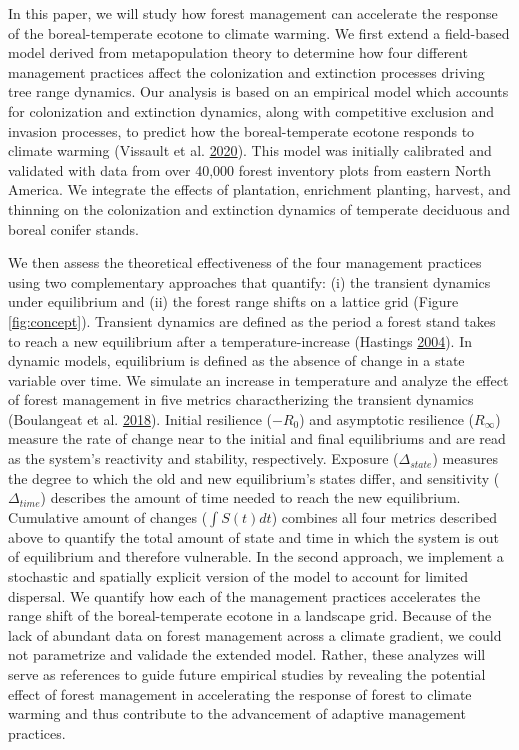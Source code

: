 \documentclass[12pt]{article}
\begin{document}
In this paper, we will study how forest management can accelerate the
response of the boreal-temperate ecotone to climate warming. We first
extend a field-based model derived from metapopulation theory to
determine how four different management practices affect the
colonization and extinction processes driving tree range dynamics. Our
analysis is based on an empirical model which accounts for colonization
and extinction dynamics, along with competitive exclusion and invasion
processes, to predict how the boreal-temperate ecotone responds to
climate warming (Vissault et al.
\protect\hyperlink{ref-Vissault2020}{2020}). This model was initially
calibrated and validated with data from over 40,000 forest inventory
plots from eastern North America. We integrate the effects of
plantation, enrichment planting, harvest, and thinning on the
colonization and extinction dynamics of temperate deciduous and boreal
conifer stands.

We then assess the theoretical effectiveness of the four management
practices using two complementary approaches that quantify: (i) the
transient dynamics under equilibrium and (ii) the forest range shifts on
a lattice grid (Figure \ref{fig:concept}). Transient dynamics are
defined as the period a forest stand takes to reach a new equilibrium
after a temperature-increase (Hastings
\protect\hyperlink{ref-Hastings2004}{2004}). In dynamic models,
equilibrium is defined as the absence of change in a state variable over
time. We simulate an increase in temperature and analyze the effect of
forest management in five metrics charactherizing the transient dynamics
(Boulangeat et al. \protect\hyperlink{ref-Boulangeat2018}{2018}).
Initial resilience (\(-R_0\)) and asymptotic resilience (\(R_{\infty}\))
measure the rate of change near to the initial and final equilibriums
and are read as the system's reactivity and stability, respectively.
Exposure (\(\Delta_{state}\)) measures the degree to which the old and
new equilibrium's states differ, and sensitivity (\(\Delta_{time}\))
describes the amount of time needed to reach the new equilibrium.
Cumulative amount of changes (\(\int S(t)dt\)) combines all four metrics
described above to quantify the total amount of state and time in which
the system is out of equilibrium and therefore vulnerable. In the second
approach, we implement a stochastic and spatially explicit version of
the model to account for limited dispersal. We quantify how each of the
management practices accelerates the range shift of the boreal-temperate
ecotone in a landscape grid. Because of the lack of abundant data on
forest management across a climate gradient, we could not parametrize
and validade the extended model. Rather, these analyzes will serve as
references to guide future empirical studies by revealing the potential
effect of forest management in accelerating the response of forest to
climate warming and thus contribute to the advancement of adaptive
management practices.
\end{document}
